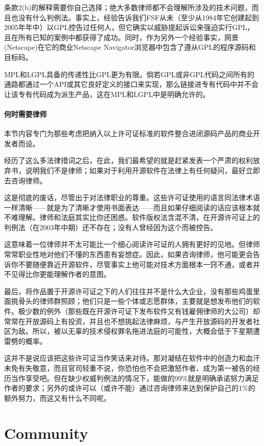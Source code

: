 \documentclass[12pt,oneside]{book}
\begin{document}
\begin{common-format}
条款2(b)的解释需要你自己选择；绝大多数律师都不会理解所涉及的技术问题，而且也没有什么判例法。事实上，经验告诉我们FSF从未（至少从1984年它创建起到2005年年中）以GPL控告过任何人，但它确实以威胁提起诉讼来强迫实行GPL，且在所有已知的案例中都获得了成功。同时，作为另外一个经验事实，网景(Netscape)在它的商业Netscape Navigator浏览器中包含了遵从GPL的程序源码和目标码。

MPL和LGPL具备的传递性比GPL更为有限。倘若GPL或非GPL代码之间所有的通路都通过一个API或其它良好定义的接口来实现，那么链接进专有代码中并不会让该专有代码成为派生产品，这在MPL和LGPL中是明确允许的。

\subsection{何时需要律师}
本节内容专门为那些考虑把纳入以上许可证标准的软件整合进闭源码产品的商业开发者而设。

经历了这么多法律措词之后，在此，我们最希望的就是赶紧发表一个严肃的权利放弃书，说明我们不是律师；如果对于利用开源软件在法律上有任何疑问，最好立即去咨询律师。

这是彻底的废话，尽管出于对法律职业的尊重。这些许可证使用的语言同法律术语一样清晰——就是为了清晰才使用书面表达——而且如果仔细阅读的话应该根本就不难理解。律师和法庭其实比你还困惑。软件版权法含混不清，在开源许可证上的判例法（在2003年中期）还不存在；没有人曾经因为这个而被控告。

这意味着一位律师并不太可能比一个细心阅读许可证的人拥有更好的见地。但律师常常职业性地对他们不懂的东西患有妄想症。因此，如果咨询律师，他可能更会告诉你不要随便靠近开源软件，尽管事实上他可能对技术方面根本一窍不通，或者并不见得比你更能理解作者的意图。

最后，将作品置于开源许可证之下的人们往往并不是什么大企业，没有那些鸡蛋里面挑骨头的律师群照顾；他们只是一些个体或志愿群体，主要就是想发布他们的软件。极少数的例外（那些既在开源许可证下发布软件又有钱雇佣律师的大公司）却常常在开放源码上有投资，并且也不想挑起法律麻烦，与产生开放源码的开发者社区为敌。所以，被以无辜的技术侵权罪名拖进法庭的可能性，大概会低于下星期遭雷劈的概率。

这并不是说应该把这些许可证当作笑话来对待。那对凝结在软件中的创造力和血汗未免有失敬意，而且官司轻重不说，你恐怕也不会把激怒作者、成为第一被告的经历当作享受吧。但在缺少权威判例法的情况下，能做的99\%{}就是明确承诺努力满足作者的要求；另外的或许可以（或许不能）通过咨询律师来达到保护自己的1\%{}的额外努力，而这又有什么不同呢。


\part{Community}

\end{common-format}
\end{document}
